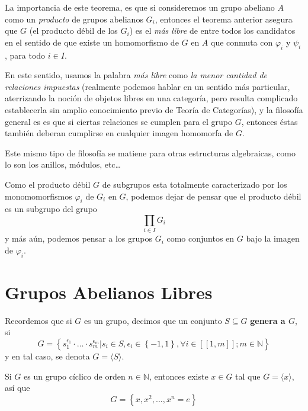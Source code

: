 \documentclass[12pt]{report}
\theoremstyle{largebreak}
\newcommand\natint[1]{\ensuremath{\left[\!\left[ #1\right]\!\right]}}
\begin{document}
    La importancia de este teorema, es que si consideremos un grupo abeliano $A$ como un \textit{producto} de grupos abelianos $G_i$, entonces el teorema anterior asegura que $G$ (el producto débil de los $G_i$) es el \textit{más libre} de entre todos los candidatos en el sentido de que existe un homomorfismo de $G$ en $A$ que conmuta con $\varphi_i$ y $\psi_i$, para todo $i\in I$.

    En este sentido, usamos la palabra \textit{más libre} como \textit{la menor cantidad de relaciones impuestas} (realmente podemos hablar en un sentido más particular, aterrizando la noción de objetos libres en una categoría, pero resulta complicado establecerla sin amplio conocimiento previo de Teoría de Categorías), y la filosofía general es es que si ciertas relaciones se cumplen para el grupo $G$, entonces éstas también deberan cumplirse en cualquier imagen homomorfa de $G$.

    Este mismo tipo de filosofía se matiene para otras estructuras algebraicas, como lo son los anillos, módulos, etc\dots

    Como el producto débil $G$ de subgrupos esta totalmente caracterizado por los monomomorfismos $\varphi_i$ de $G_i$ en $G$, podemos dejar de pensar que el producto débil es un subgrupo del grupo
    \begin{equation*}
        \prod_{ i\in I}G_i
    \end{equation*}
    y más aún, podemos pensar a los grupos $G_i$ como conjuntos en $G$ bajo la imagen de $\varphi_i$.

    \section{Grupos Abelianos Libres}

    Recordemos que si $G$ es un grupo, decimos que un conjunto $S\subseteq G$ \textbf{genera a $G$}, si
    \begin{equation*}
        G=\left\{s_1^{\epsilon_1}\cdot\dots\cdot s_m^{\epsilon_m}\Big|s_i\in S,\epsilon_i\in\left\{-1,1\right\}, \forall i\in\natint{1,m}; m\in\mathbb{N} \right\}
    \end{equation*}
    y en tal caso, se denota $G=\langle S\rangle$. 

    \begin{exa}
        Si $G$ es un grupo cíclico de orden $n\in\mathbb{N}$, entonces existe $x\in G$ tal que $G=\langle x\rangle$, así que
        \begin{equation*}
            G=\left\{x,x^2,...,x^n=e\right\}
        \end{equation*}
    \end{exa}
\end{document}
